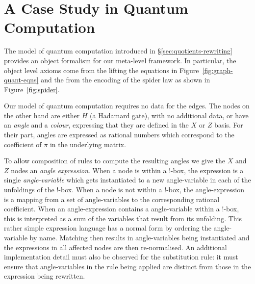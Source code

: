 \documentclass[runningheads]{llncs}
\begin{document}
 

\section{A Case Study in Quantum Computation}
\label{sec:case-study}

The model of quantum computation introduced in
\S\ref{sec:quotients-rewriting} provides an object formalism for our
meta-level framework. In particular, the object level axioms come from
the lifting the equations in Figure~\ref{fig:graph-quant-eqns} and the
from the encoding of the spider law as shown in
Figure~\ref{fig:spider}.


Our model of quantum computation requires no data for the edges. The
nodes on the other hand are either $H$ (a Hadamard gate), with no
additional data, or have an \emph{angle} and a \emph{colour}, expressing that
they are defined in the $X$ or $Z$ basis. For their part, angles are
expressed as rational numbers 
which correspond to the coefficient of $\pi$ in the underlying matrix.

To allow composition of rules to compute the resulting angles we give
the $X$ and $Z$ nodes an \emph{angle expression}. When a node is
within a !-box, the expression is a single \emph{angle-variable} which
gets instantiated to a new angle-variable in each of the unfoldings of
the !-box.  When a node is not within a !-box, the angle-expression is
a mapping from a set of angle-variables to the corresponding rational
coefficient. When an angle-expression contains a angle-variable within
a !-box, this is interpreted as a sum of the variables that result
from its unfolding.  This rather simple expression language has a
normal form by ordering the angle-variable by name.  Matching then
results in angle-variables being instantiated and the expressions in
all affected nodes are then re-normalised. An additional
implementation detail must also be observed for the substitution rule:
it must ensure that angle-variables in the rule being applied are
distinct from those in the expression being rewritten.


\end{document}

